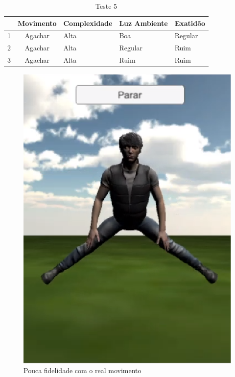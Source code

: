 \begin{table}[H]
\centering
\caption{Teste 5}
\label{tab:teste5}
\begin{tabular}{@{}|c|c|l|l|l|@{}}
\toprule
\multicolumn{1}{|l|}{ } & \multicolumn{1}{l|}{\textbf{Movimento}} & \textbf{Complexidade} & \textbf{Luz Ambiente} & \textbf{Exatidão} \\ \midrule
1                                 & Agachar                     & Alta                 & Boa                   & Regular               \\ \midrule
2                                 & Agachar                     & Alta                 & Regular               & Ruim           \\ \midrule
3                                 & Agachar                     & Alta                 & Ruim                  & Ruim              \\ \bottomrule
\end{tabular}
\end{table}


\begin{figure}[H]
\centering
\includegraphics [keepaspectratio=true,scale=0.60]{figuras/agachar.eps}
\caption{Pouca fidelidade com o real movimento}
\label{img:teste5}
\end{figure}


